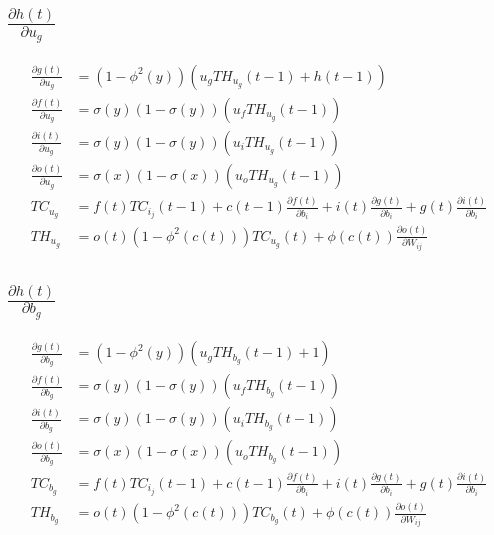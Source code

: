 \documentclass[twoside,11pt]{article}
\begin{document}
\subsection{$\frac{\partial h(t)}{\partial u_{g}}$}

\begin{equation}
\begin{aligned}
\frac{\partial g(t)}{\partial u_{g}} &=  
(1-\phi^2(y))(u_g TH_{u_{g}}(t-1)+ h(t-1))  \\
\frac{\partial f(t)}{\partial u_{g}} &=  \sigma(y)(1-\sigma(y))( u_f TH_{u_{g}}(t-1)) \\
\frac{\partial i(t)}{\partial u_{g}}  &= \sigma(y)(1-\sigma(y))( u_i TH_{u_{g}}(t-1))  \\
\frac{\partial o(t)}{\partial u_{g}} &=  \sigma(x)(1-\sigma(x))( u_o TH_{u_{g}}(t-1))  \\
TC_{u_{g}}&= f(t) TC_{i_j}(t-1) + c(t-1)\frac{\partial f(t)}{ \partial b_i} + i(t)\frac{\partial g(t) }{\partial b_i}  + g(t)\frac{\partial i(t) }{\partial b_i}  \\
TH_{u_{g}}&= o(t) (1-\phi^{2}(c(t))) TC_{u_{g}}(t)  + \phi(c(t)) \frac{\partial o(t)}{\partial W_{ij}}  
\end{aligned}
\end{equation}


\subsection{$\frac{\partial h(t)}{\partial b_{g}}$}

\begin{equation}
\begin{aligned}
\frac{\partial g(t)}{\partial b_{g}} &=  
(1-\phi^2(y))(u_g TH_{b_{g}}(t-1)+ 1)  \\
\frac{\partial f(t)}{\partial b_{g}} &=  \sigma(y)(1-\sigma(y))( u_f TH_{b_{g}}(t-1)) \\
\frac{\partial i(t)}{\partial b_{g}}  &= \sigma(y)(1-\sigma(y))(u_i TH_{b_{g}}(t-1))  \\
\frac{\partial o(t)}{\partial b_{g}} &=  \sigma(x)(1-\sigma(x))( u_o TH_{b_{g}}(t-1))  \\
TC_{b_{g}}&= f(t) TC_{i_j}(t-1) + c(t-1)\frac{\partial f(t)}{ \partial b_i} + i(t)\frac{\partial g(t) }{\partial b_i}  + g(t)\frac{\partial i(t) }{\partial b_i}  \\
TH_{b_{g}}&= o(t) (1-\phi^{2}(c(t))) TC_{b_{g}}(t)  + \phi(c(t)) \frac{\partial o(t)}{\partial W_{ij}}  
\end{aligned}
\end{equation}
\end{document}
